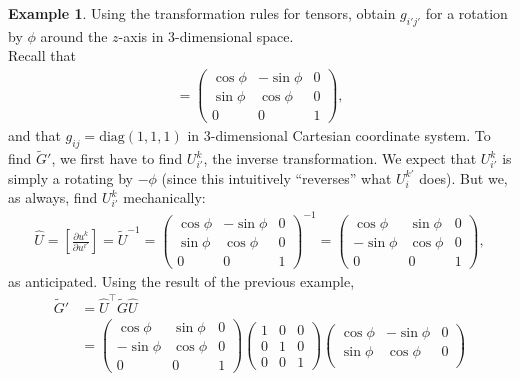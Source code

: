 \documentclass{article}
\theoremstyle{definition}
\newtheorem{exmp}{Example}[section]
\begin{document}
\begin{exmp}
	Using the transformation rules for tensors, obtain $g_{i'j'}$ for a rotation by $\phi$ around the $z$-axis in 3-dimensional space. \\
	
	Recall that
	\begin{align*}
	[U^{j'}_i] = 
	\begin{pmatrix}
	\cos\phi & -\sin\phi & 0\\
	\sin\phi & \cos\phi & 0 \\
	0 & 0 & 1
	\end{pmatrix},
	\end{align*}
	and that $g_{ij} = \text{diag}(1,1,1)$ in 3-dimensional Cartesian coordinate system. To find $\tilde{G}'$, we first have to find $U^k_{i'}$, the inverse transformation. We expect that $U^k_{i'}$ is simply a rotating by $-\phi$ (since this intuitively ``reverses'' what $U^{k'}_{i}$ does). But we, as always, find $U^k_{i'}$ mechanically:
	\begin{align*}
	\hat{U} = \left[\frac{\partial u^k}{\partial u^{i'}} \right]  =\tilde{U}^{-1} = 
	\begin{pmatrix}
	\cos\phi & -\sin\phi & 0\\
	\sin\phi & \cos\phi & 0 \\
	0 & 0 & 1
	\end{pmatrix}^{-1}
	=
	\begin{pmatrix}
	\cos\phi & \sin\phi & 0\\
	-\sin\phi & \cos\phi & 0 \\
	0 & 0 & 1
	\end{pmatrix},
	\end{align*} 
	as anticipated. Using the result of the previous example,
	\begin{align*}
	\tilde{G}' &= \hat{U}^{\top}\tilde{G}\hat{U}\\
	&= \begin{pmatrix}
	\cos\phi & \sin\phi & 0\\
	-\sin\phi & \cos\phi & 0 \\
	0 & 0 & 1
	\end{pmatrix}
	\begin{pmatrix}
	1 & 0 & 0\\
	0 & 1 & 0\\
	0 & 0 & 1
	\end{pmatrix}
	\begin{pmatrix}
	\cos\phi & -\sin\phi & 0\\
	\sin\phi & \cos\phi & 0 \\

\end{pmatrix}
\end{align*}
\end{exmp}
\end{document}
